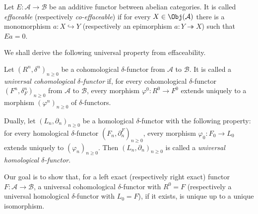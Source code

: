 \begin{definition}[A.\ Grothendieck]\label{def:erasable}
	Let $E:\mathcal{A}\to\mathcal{B}$ be an additive functor between abelian
	categories. It is called \emph{effaceable} (respectively
	\emph{co-effaceable}) if for every $X\in\Obj(\mathcal{A})$ there is a
	monomorphism $a:X\hookrightarrow Y$ (respectively an epimorphism
	$a:Y\twoheadrightarrow X$) such that $Ea=0$.
\end{definition}

We shall derive the following universal property from effaceability.

\begin{definition}\label{def:universal-delta-functor}
	Let $(R^n,\delta^n)_{n\geq0}$ be a cohomological $\delta$-functor from
	$\mathcal{A}$ to $\mathcal{B}$. It is called a \emph{universal
	cohomological $\delta$-functor} if, for every cohomological $\delta$-functor
	$(F^n,\delta_F^n)_{n\geq0}$ from $\mathcal{A}$ to $\mathcal{B}$, every
	morphism $\varphi^0:R^0\to F^0$ extends uniquely to a morphism
	$(\varphi^n)_{n\geq0}$ of $\delta$-functors.

	Dually, let $(L_n,\partial_n)_{n\geq0}$ be a homological $\delta$-functor
	with the following property: for every homological $\delta$-functor
	$(F_n,\partial_n^F)_{n\geq0}$, every morphism $\varphi_0:F_0\to L_0$
	extends uniquely to $(\varphi_n)_{n\geq0}$. Then
	$(L_n,\partial_n)_{n\geq0}$ is called a \emph{universal homological
	$\delta$-functor}.
\end{definition}

Our goal is to show that, for a left exact (respectively right exact) functor
$F:\mathcal{A}\to\mathcal{B}$, a universal cohomological $\delta$-functor
with $R^0=F$ (respectively a universal homological $\delta$-functor with
$L_0=F$), if it exists, is unique up to a unique isomorphism.

